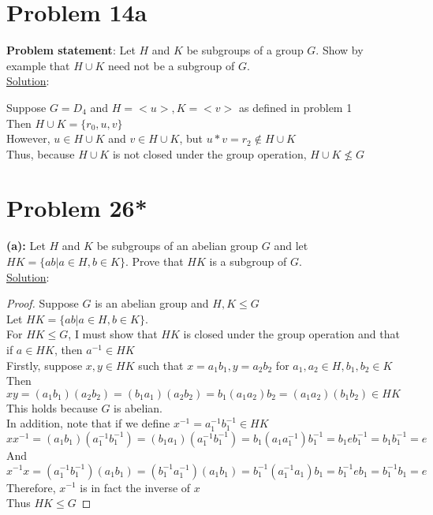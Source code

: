 \documentclass{article} %
\begin{document}
\newpage
\section*{Problem 14a}


\textbf{Problem statement}: Let $H$ and $K$ be subgroups of a group $G$.  Show by example that $H \cup K$ need not be a subgroup of $G$.
\\

\underline{Solution}: 
\begin{addmargin}[1em]{0em}
Suppose $G = D_4$ and $H = <u>, K = <v>$ as defined in problem 1
\\Then $H \cup K = \{r_0, u, v\}$
\\However, $u \in H \cup K$ and $v \in H \cup K$, but $u*v = r_2 \not\in H \cup K$
\\Thus, because $H \cup K$ is not closed under the group operation, $H \cup K \not\leq G$
\end{addmargin}    

\newpage
\section*{Problem 26*}


\textbf{(a): }Let $H$ and $K$ be subgroups of an abelian group $G$ and let $HK = \{ab|a \in H, b \in K\}$.  Prove that $HK$ is a subgroup of $G$. 
\\

\underline{Solution}: 
\begin{addmargin}[1em]{0em}
\begin{proof}
Suppose $G$ is an abelian group and $H, K \leq G$
\\Let $HK = \{ab|a \in H, b \in K \}$.
\\For $HK \leq G$, I must show that $HK$ is closed under the group operation and that if $a \in HK$, then $a^{-1} \in HK$
\\Firstly, suppose $x,y \in HK$ such that $x = a_1b_1, y = a_2b_2$ for $a_1,a_2 \in H, b_1,b_2 \in K$
\\Then $xy = (a_1b_1)(a_2b_2) = (b_1a_1)(a_2b_2) = b_1(a_1a_2)b_2 = (a_1a_2)(b_1b_2) \in HK$
\\This holds because $G$ is abelian.
\\In addition, note that if we define $x^{-1} = a_1^{-1}b_1^{-1} \in HK$
\\ $xx^{-1} = (a_1b_1)(a_1^{-1}b_1^{-1}) = (b_1a_1)(a_1^{-1}b_1^{-1})=b_1(a_1a_1^{-1})b_1^{-1}=b_1eb_1^{-1}=b_1b_1^{-1}=e$
\\And $x^{-1}x = (a_1^{-1}b_1^{-1})(a_1b_1) = (b_1^{-1}a_1^{-1})(a_1b_1)=b_1^{-1}(a_1^{-1}a_1)b_1=b_1^{-1}eb_1=b_1^{-1}b_1=e$
\\Therefore, $x^{-1}$ is in fact the inverse of $x$
\\Thus $HK \leq G$
\end{proof}
\end{addmargin}    
\end{document}
